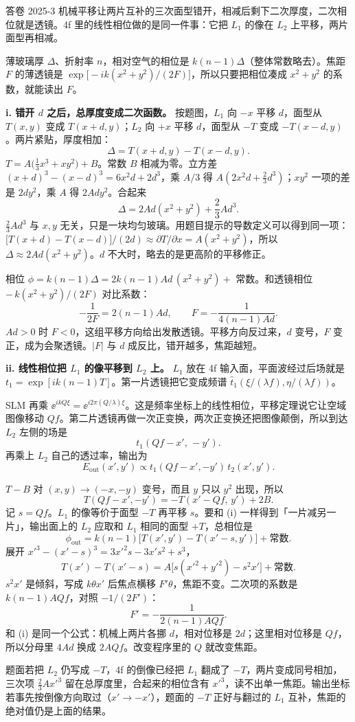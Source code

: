 \begin{exam}{答卷 2025-3}
机械平移让两片互补的三次面型错开，相减后剩下二次厚度，二次相位就是透镜。4f 里的线性相位做的是同一件事：它把 $L_1$ 的像在 $L_2$ 上平移，两片面型再相减。

薄玻璃厚 $\Delta$、折射率 $n$，相对空气的相位是 $k(n-1)\Delta$（整体常数略去）。焦距 $F$ 的薄透镜是 $\exp\bigl[-ik(x^2+y^2)/(2F)\bigr]$，所以只要把相位凑成 $x^2+y^2$ 的系数，就能读出 $F$。

\textbf{i. 错开 $d$ 之后，总厚度变成二次函数。}
按题图，$L_1$ 向 $-x$ 平移 $d$，面型从 $T(x,y)$ 变成 $T(x+d,y)$；$L_2$ 向 $+x$ 平移 $d$，面型从 $-T$ 变成 $-T(x-d,y)$。两片紧贴，厚度相加：
\[
\Delta=T(x+d,y)-T(x-d,y).
\]
$T=A\bigl(\frac13 x^3+xy^2\bigr)+B$。常数 $B$ 相减为零。立方差 $(x+d)^3-(x-d)^3=6x^2d+2d^3$，乘 $A/3$ 得 $A(2x^2d+\frac23 d^3)$；$xy^2$ 一项的差是 $2dy^2$，乘 $A$ 得 $2Ady^2$。合起来
\[
\Delta=2Ad(x^2+y^2)+\frac23 Ad^3 .
\]
$\frac23 Ad^3$ 与 $x,y$ 无关，只是一块均匀玻璃。用题目提示的导数定义可以得到同一项：$\bigl[T(x+d)-T(x-d)\bigr]/(2d)\approx\partial T/\partial x=A(x^2+y^2)$，所以 $\Delta\approx2Ad(x^2+y^2)$。$d$ 不大时，略去的是更高阶的平移修正。

相位 $\phi=k(n-1)\Delta=2k(n-1)Ad\,(x^2+y^2)+$ 常数。和透镜相位 $-\,k(x^2+y^2)/(2F)$ 对比系数：
\[
-\frac{1}{2F}=2(n-1)Ad,\qquad\boxed{F=-\frac{1}{4(n-1)Ad}} .
\]
$Ad>0$ 时 $F<0$，这组平移方向给出发散透镜。平移方向反过来，$d$ 变号，$F$ 变正，成为会聚透镜。$|F|$ 与 $d$ 成反比，错开越多，焦距越短。

\textbf{ii. 线性相位把 $L_1$ 的像平移到 $L_2$ 上。}
$L_1$ 放在 4f 输入面，平面波经过后场就是 $t_1=\exp[ik(n-1)T]$。第一片透镜把它变成频谱 $\hat t_1(\xi/(\lambda f),\eta/(\lambda f))$。

SLM 再乘 $\ee^{ikQ\xi}=\ee^{i2\pi(Q/\lambda)\xi}$。这是频率坐标上的线性相位，平移定理说它让空域图像移动 $Qf$。第二片透镜再做一次正变换，两次正变换还把图像颠倒，所以到达 $L_2$ 左侧的场是
\[
t_1(Qf-x',\,-y') .
\]
再乘上 $L_2$ 自己的透过率，输出为
\[
\boxed{E_{\text{out}}(x',y')\propto t_1(Qf-x',-y')\,t_2(x',y')} .
\]

$T-B$ 对 $(x,y)\to(-x,-y)$ 变号，而且 $y$ 只以 $y^2$ 出现，所以
\[
T(Qf-x',-y')=-T(x'-Qf,\,y')+2B .
\]
记 $s=Qf$。$L_1$ 的像等价于面型 $-T$ 再平移 $s$。要和 (i) 一样得到「一片减另一片」，输出面上的 $L_2$ 应取和 $L_1$ 相同的面型 $+T$，总相位是
\[
\phi_{\text{out}}=k(n-1)\bigl[T(x',y')-T(x'-s,y')\bigr]+\text{常数}.
\]
展开 $x'^3-(x'-s)^3=3x'^2s-3x's^2+s^3$，
\[
T(x')-T(x'-s)=A\bigl[s(x'^2+y'^2)-s^2 x'\bigr]+\text{常数}.
\]
$s^2 x'$ 是倾斜，写成 $k\theta x'$ 后焦点横移 $F'\theta$，焦距不变。二次项的系数是 $k(n-1)AQf$，对照 $-1/(2F')$：
\[
\boxed{F'=-\frac{1}{2(n-1)AQf}} .
\]
和 (i) 是同一个公式：机械上两片各挪 $d$，相对位移是 $2d$；这里相对位移是 $Qf$，所以分母里 $4Ad$ 换成 $2AQf$。改变程序里的 $Q$ 就改变焦距。

题面若把 $L_2$ 仍写成 $-T$，4f 的倒像已经把 $L_1$ 翻成了 $-T$，两片变成同号相加，三次项 $\frac23 A x'^3$ 留在总厚度里，合起来的相位含有 $x'^3$，读不出单一焦距。输出坐标若事先按倒像方向取过（$x'\to-x'$），题面的 $-T$ 正好与翻过的 $L_1$ 互补，焦距的绝对值仍是上面的结果。
\end{exam}


